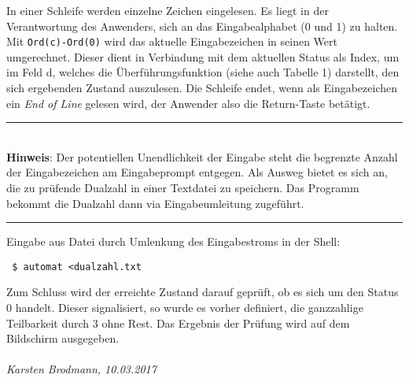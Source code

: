 \documentclass[draft=false]{scrartcl}
\newenvironment{achtung}[1][Achtung]{%
	\rule{\textwidth}{1pt}\\%
	\textbf{#1}: %
}{%
	\\\rule[1ex]{\textwidth}{1pt}%
}
\begin{document}
In einer Schleife werden einzelne Zeichen eingelesen. Es liegt in der Verantwortung des Anwenders, sich an das Eingabealphabet (0 und 1) zu halten. Mit \texttt{Ord(c)-Ord(\textquotesingle{}0\textquotesingle{})} wird das aktuelle Eingabezeichen in seinen Wert umgerechnet. Dieser dient in Verbindung mit dem aktuellen Status als Index, um im Feld d, welches die Überführungsfunktion (siehe auch Tabelle 1) darstellt, den sich ergebenden Zustand auszulesen. Die Schleife endet, wenn als Eingabezeichen ein \emph{End of Line} gelesen wird, der Anwender also die Return-Taste betätigt.

\begin{achtung}[Hinweis] %
Der potentiellen Unendlichkeit der Eingabe steht die begrenzte Anzahl der Ein\-ga\-be\-zei\-chen am Eingabeprompt entgegen. Als Ausweg bietet es sich an, die zu prüfende Du\-al\-zahl in einer Textdatei zu speichern. Das Programm bekommt die Dualzahl dann via Ein\-ga\-be\-um\-lei\-tung zugeführt.
\end{achtung}

 Eingabe aus Datei durch Umlenkung des Eingabestroms in der Shell:

\verb| $ automat <dualzahl.txt|

Zum Schluss wird der erreichte Zustand darauf geprüft, ob es sich um den Status 0 handelt. Dieser signalisiert, so wurde es vorher definiert, die ganzzahlige Teilbarkeit durch 3 ohne Rest. Das Ergebnis der Prüfung wird auf dem Bildschirm ausgegeben.
\\\\
\textsl{Karsten Brodmann, 10.03.2017} 
\end{document}
